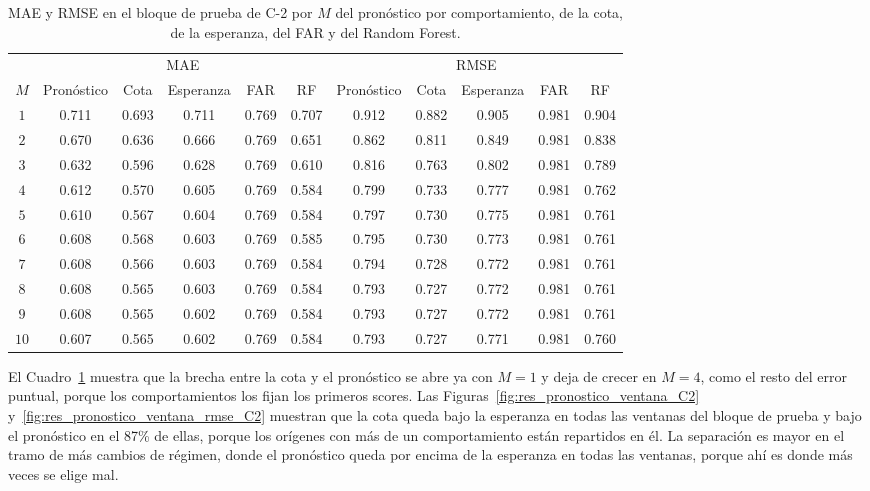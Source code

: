 \begin{table}[H]
\centering\small
\setlength{\tabcolsep}{4pt}
\caption{MAE y RMSE en el bloque de prueba de C-2 por $M$ del pronóstico por comportamiento, de la cota, de la esperanza, del FAR y del Random Forest.}
\label{tab:res_pronostico_por_M}
\begin{tabular}{c ccccc ccccc}
\hline
 & \multicolumn{5}{c}{MAE} & \multicolumn{5}{c}{RMSE} \\
$M$ & Pronóstico & Cota & Esperanza & FAR & RF & Pronóstico & Cota & Esperanza & FAR & RF \\
\hline
$1$ & 0.711 & 0.693 & 0.711 & 0.769 & 0.707 & 0.912 & 0.882 & 0.905 & 0.981 & 0.904 \\
$2$ & 0.670 & 0.636 & 0.666 & 0.769 & 0.651 & 0.862 & 0.811 & 0.849 & 0.981 & 0.838 \\
$3$ & 0.632 & 0.596 & 0.628 & 0.769 & 0.610 & 0.816 & 0.763 & 0.802 & 0.981 & 0.789 \\
$4$ & 0.612 & 0.570 & 0.605 & 0.769 & 0.584 & 0.799 & 0.733 & 0.777 & 0.981 & 0.762 \\
$5$ & 0.610 & 0.567 & 0.604 & 0.769 & 0.584 & 0.797 & 0.730 & 0.775 & 0.981 & 0.761 \\
$6$ & 0.608 & 0.568 & 0.603 & 0.769 & 0.585 & 0.795 & 0.730 & 0.773 & 0.981 & 0.761 \\
$7$ & 0.608 & 0.566 & 0.603 & 0.769 & 0.584 & 0.794 & 0.728 & 0.772 & 0.981 & 0.761 \\
$8$ & 0.608 & 0.565 & 0.603 & 0.769 & 0.584 & 0.793 & 0.727 & 0.772 & 0.981 & 0.761 \\
$9$ & 0.608 & 0.565 & 0.602 & 0.769 & 0.584 & 0.793 & 0.727 & 0.772 & 0.981 & 0.761 \\
$10$ & 0.607 & 0.565 & 0.602 & 0.769 & 0.584 & 0.793 & 0.727 & 0.771 & 0.981 & 0.760 \\
\hline
\end{tabular}
\end{table}

El Cuadro~\ref{tab:res_pronostico_por_M} muestra que la brecha entre la cota y el pronóstico se abre ya con $M = 1$ y deja de crecer en $M = 4$, como el resto del error puntual, porque los comportamientos los fijan los primeros scores. Las Figuras~\ref{fig:res_pronostico_ventana_C2} y~\ref{fig:res_pronostico_ventana_rmse_C2} muestran que la cota queda bajo la esperanza en todas las ventanas del bloque de prueba y bajo el pronóstico en el 87\% de ellas, porque los orígenes con más de un comportamiento están repartidos en él. La separación es mayor en el tramo de más cambios de régimen, donde el pronóstico queda por encima de la esperanza en todas las ventanas, porque ahí es donde más veces se elige mal.

